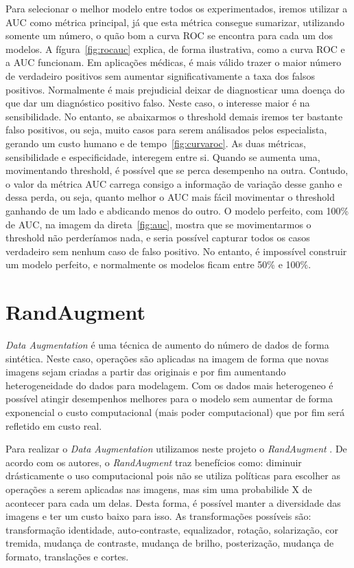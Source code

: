 \documentclass[ %
	msc, %
	portugues %
]{../ppgccufmg}
\begin{document}
    Para selecionar o melhor modelo entre todos os experimentados, iremos utilizar a AUC como
    métrica principal, já que esta métrica consegue sumarizar, utilizando somente um número, o quão bom
    a curva ROC se encontra para cada um dos modelos. A fígura~\ref{fig:rocauc} explica, de forma
    ilustrativa, como a curva ROC e a AUC funcionam.  Em aplicações médicas, é mais válido trazer o maior
    número de verdadeiro positivos sem aumentar significativamente a taxa dos falsos positivos.
    Normalmente é mais prejudicial deixar de diagnosticar uma doença do que dar um diagnóstico
    positivo falso. Neste caso, o interesse maior é na sensibilidade. No entanto, se abaixarmos o
    threshold demais iremos ter bastante falso positivos, ou seja, muito casos para serem análisados
    pelos especialista, gerando um custo humano e de tempo~\ref{fig:curvaroc}. As duas métricas, sensibilidade e
    especificidade, interegem entre si. Quando se aumenta uma, movimentando threshold, é possível
    que se perca desempenho na outra. Contudo, o valor da métrica AUC carrega consigo a informação de
    variação desse ganho e dessa perda, ou seja, quanto melhor o AUC mais fácil movimentar o
    threshold ganhando de um lado e abdicando menos do outro. O modelo perfeito, com 100\% de AUC,
    na imagem da direta~\ref{fig:auc}, mostra que se movimentarmos o threshold não perderíamos nada, e
    seria possível capturar todos os casos verdadeiro sem nenhum caso de falso positivo.
    No entanto, é impossível construir um modelo perfeito, e normalmente os modelos ficam entre 50\% e 100\%.


    \section{RandAugment}
    \label{sec:aug}

    \textit{Data Augmentation} \citep{data_aug} é uma técnica de aumento do número de dados de forma sintética. Neste
    caso, operações são aplicadas na imagem de forma que novas imagens sejam criadas a
    partir das originais e por fim aumentando heterogeneidade do dados para modelagem. Com os dados
    mais heterogeneo é possível atingir desempenhos melhores para o modelo sem aumentar de forma
    exponencial o custo computacional (mais poder computacional) que por fim será refletido em custo
    real.

    \par Para realizar o \textit{Data Augmentation} utilizamos neste projeto o
    \textit{RandAugment} \citep{randaug}. De acordo com os autores, o \textit{RandAugment} traz
    benefícios como: diminuir drásticamente o uso computacional pois não se utiliza políticas para
    escolher as operações a serem aplicadas nas imagens, mas sim uma probabilide X de acontecer para
    cada um delas. Desta forma, é possível manter a diversidade das imagens e ter um custo baixo
    para isso. As transformações possíveis são: transformação identidade,
    auto-contraste, equalizador, rotação, solarização, cor tremida, mudança de contraste, mudança de
    brilho, posterização, mudança de formato, translações e cortes.
\end{document}
